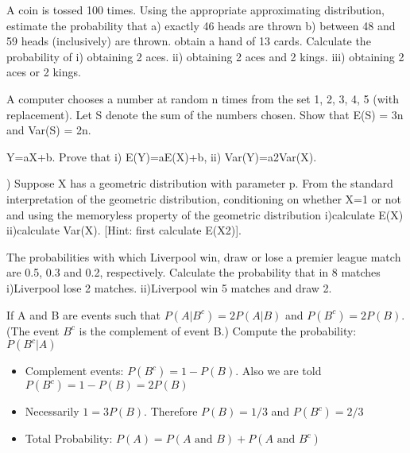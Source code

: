 
\item A coin is tossed 100 times. Using the appropriate approximating distribution, estimate the probability that
a) exactly 46 heads are thrown
b) between 48 and 59 heads (inclusively) are thrown.
\itemI obtain a hand of 13 cards. Calculate the probability of
i) obtaining 2 aces.
ii) obtaining 2 aces and 2 kings.
iii) obtaining 2 aces or 2 kings.

\item A computer chooses a number at random n times from the set {1, 2, 3, 4, 5} (with replacement). Let S denote the sum of the numbers chosen. Show that
E(S) = 3n and Var(S) = 2n.

\itemLet Y=aX+b. Prove that i) E(Y)=aE(X)+b, ii) Var(Y)=a2Var(X).

\itema) Suppose X has a geometric distribution with parameter p. From the standard interpretation of the geometric distribution, conditioning on whether X=1 or not and using the memoryless property of the geometric distribution
i)calculate E(X)
ii)calculate Var(X). [Hint: first calculate E(X2)].

\item The probabilities with which Liverpool win, draw or lose a premier league match are 0.5, 0.3 and 0.2, respectively. Calculate the probability that in 8 matches
i)Liverpool lose 2 matches.
ii)Liverpool win 5 matches and draw 2.
\item %
If A and B are events such that $P(A|B^c) = 2P(A|B)$ and $P(B^c) = 2P(B)$.
(The event $B^c$ is the complement of event B.) Compute the probability: $P(B^c|A)$ 
\begin{framed}
\begin{itemize}
\item Complement events: $P(B^c) = 1 - P(B)$. Also we are told $P(B^c) = 1-P(B)= 2P(B)$
\item Necessarily $1 = 3P(B)$. Therefore $P(B) = 1/3$ and  $P(B^c)=2/3$
\item Total Probability: $P(A) = P(A \mbox{ and } B) + P(A \mbox{ and } B^c)$
\end{itemize}
\end{framed}
